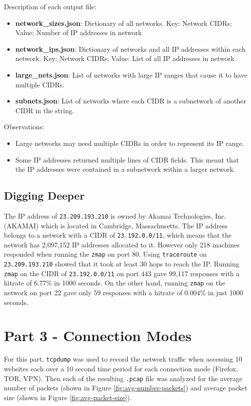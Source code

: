 \documentclass[11pt]{article}
\begin{document}
\noindent Description of each output file:
\begin{itemize}
\item\textbf{network\_sizes.json}: Dictionary of all networks. Key: Network CIDRs; Value: Number of IP addresses in network

\item\textbf{network\_ips.json}: Dictionary of networks and all IP addresses within each network. Key: Network CIDRs; Value: List of all IP addresses in network

\item\textbf{large\_nets.json}: List of networks with large IP ranges that cause it to have multiple CIDRs.

\item\textbf{subnets.json}: List of networks where each CIDR is a subnetwork of another CIDR in the string.
\end{itemize}

\noindent Observations:
\begin{itemize}
  \item Large networks may need multiple CIDRs in order to represent its IP range.
  \item Some IP addresses returned multiple lines of CIDR fields. This meant that the IP addresses were contained in a subnetwork within a larger network.
\end{itemize}

\subsection*{Digging Deeper}
The IP address of \verb|23.209.193.210| is owned by Akamai Technologies, Inc. (AKAMAI) which is located in Cambridge, Massachusetts. 
The IP address belongs to a network with a CIDR of \verb|23.192.0.0/11|, which means that the network has 2,097,152
IP addresses allocated to it. However only 218 machines responded when running the \verb|zmap| on port 80.
Using \verb|traceroute| on \verb|23.209.193.210| showed that it took at least 30 hops to reach the IP.
Running \verb|zmap| on the CIDR of \verb|23.192.0.0/11| on port 443 gave 99,117 responses with a hitrate of 6.77\% in
1000 seconds. On the other hand, running \verb|zmap| on the network on port 22 gave only 59 responses with a hitrate
of 0.004\% in just 1000 seconds.

\newpage
\section*{Part 3 - Connection Modes}
\label{sec:part-3}
For this part, \verb|tcpdump| was used to record the network traffic when accessing 10 websites each over a 10 second time period for each connection mode (Firefox, TOR, VPN).
Then each of the resulting \verb|.pcap| file was analyzed for the average number of packets (shown in Figure \ref{fig:avg-number-packets})
and average packet size (shown in Figure \ref{fig:avg-packet-size}).
\end{document}
